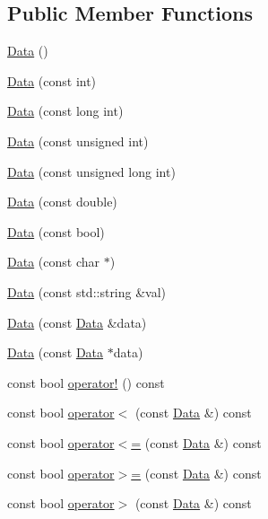 \subsection*{Public Member Functions}
\begin{DoxyCompactItemize}
\item 
\hyperlink{classklop_1_1Data_ad284df59897b5b49b9c79f114c65d49e}{Data} ()
\item 
\hyperlink{classklop_1_1Data_ac8d6b5827ea7d9513f9cd8371497fbaf}{Data} (const int)
\item 
\hyperlink{classklop_1_1Data_adda544dd3c4e4b399f2cc0486b84f29b}{Data} (const long int)
\item 
\hyperlink{classklop_1_1Data_aa72b4f5a0b7f68453f3e3d9a554313dd}{Data} (const unsigned int)
\item 
\hyperlink{classklop_1_1Data_ac6a6fd2aec08bda3e2ffdb7ef131ebd6}{Data} (const unsigned long int)
\item 
\hyperlink{classklop_1_1Data_a38de57cc4008c43eecb076f787580e94}{Data} (const double)
\item 
\hyperlink{classklop_1_1Data_ab3e35093d3e8305ea35c08a20ac97e46}{Data} (const bool)
\item 
\hyperlink{classklop_1_1Data_ac0fd9e3bc76841bf81f3a96e0f1265cf}{Data} (const char $\ast$)
\item 
\hyperlink{classklop_1_1Data_a9aeeaf9ca062b969cfaf98c4244eb94b}{Data} (const std::string \&val)
\item 
\hyperlink{classklop_1_1Data_a9b91dadcc3da66d6ee8e9d52d545f0a9}{Data} (const \hyperlink{classklop_1_1Data}{Data} \&data)
\item 
\hyperlink{classklop_1_1Data_af48f150441884eb51bfdfa8877e3a982}{Data} (const \hyperlink{classklop_1_1Data}{Data} $\ast$data)
\item 
const bool \hyperlink{classklop_1_1Data_abebdd948e987a87d05a2048c9a9d4447}{operator!} () const 
\item 
const bool \hyperlink{classklop_1_1Data_a9a26a45a336e5aa4fda427f4b6e63282}{operator$<$} (const \hyperlink{classklop_1_1Data}{Data} \&) const 
\item 
const bool \hyperlink{classklop_1_1Data_a7c154d4dcf5d63c8a54c267a0d51c2cc}{operator$<$=} (const \hyperlink{classklop_1_1Data}{Data} \&) const 
\item 
const bool \hyperlink{classklop_1_1Data_a855d8c8d79d9456cb2bbc512e2092548}{operator$>$=} (const \hyperlink{classklop_1_1Data}{Data} \&) const 
\item 
const bool \hyperlink{classklop_1_1Data_a765ddd7dde37b5370872b701e78f7001}{operator$>$} (const \hyperlink{classklop_1_1Data}{Data} \&) const 

\end{DoxyCompactItemize}

